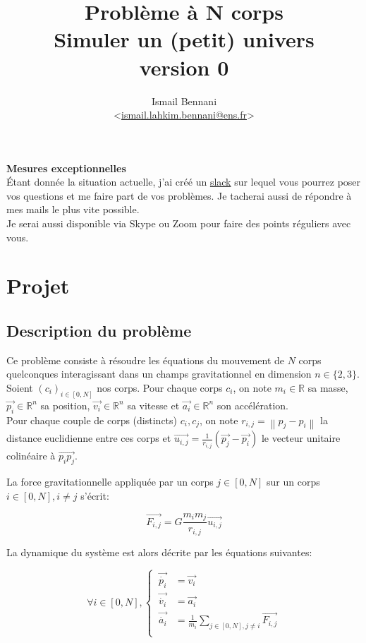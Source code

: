 \documentclass{article}
\title{\textbf{Problème à N corps} \\
       \Large Simuler un (petit) univers\\
       \small version 0}
\author{Ismail Bennani \\
        <\href{mailto:ismail.lahkim.bennani@ens.fr}{ismail.lahkim.bennani@ens.fr}>}
\newcommand{\norm}[1]{\left\lVert#1\right\rVert}
\begin{document}
\maketitle

\noindent\textbf{Mesures exceptionnelles}\\
Étant donnée la situation actuelle, j'ai créé un \href{https://join.slack.com/t/in104n-bodyproblem/shared_invite/zt-cu07sew6-nw8ikZtOZBy2UmpqReQdWA}{slack} sur lequel vous pourrez poser vos questions et me faire part de vos problèmes. Je tacherai aussi de répondre à mes mails le plus vite possible.\\
Je serai aussi disponible via Skype ou Zoom pour faire des points réguliers avec vous.


\section{Projet}

\subsection{Description du problème}

Ce problème consiste à résoudre les équations du mouvement de $N$ corps quelconques interagissant dans un champs gravitationnel en dimension ${n\in \{ 2,3 \}}$.\\
Soient $(c_i)_{i\in[0,N]}$ nos corps. Pour chaque corps $c_i$, on note $m_i \in \mathbb{R}$ sa masse, $\overrightarrow{p_i} \in \mathbb{R}^n$ sa position, $\overrightarrow{v_i} \in \mathbb{R}^n$ sa vitesse et $\overrightarrow{a_i} \in \mathbb{R}^n$ son accélération.\\
Pour chaque couple de corps (distincts) $c_i, c_j$, on note $r_{i,j} = \norm{p_j - p_i}$ la distance euclidienne entre ces corps et $\overrightarrow{u_{i,j}} = \frac{1}{r_{i,j}}(\overrightarrow{p_j}-\overrightarrow{p_i})$ le vecteur unitaire colinéaire à $\overrightarrow{p_ip_j}$.

La force gravitationnelle appliquée par un corps $j \in [0,N]$ sur un corps $i \in [0,N], i \ne j$ s'écrit:

\begin{equation}
    \overrightarrow{F_{i,j}} = G \frac{m_im_j}{r_{i,j}} \overrightarrow{u_{i,j}}
\end{equation}

La dynamique du système est alors décrite par les équations suivantes:

\begin{equation}
\forall i \in [0,N], \left\{\begin{aligned}
    \ \overrightarrow{\dot{p_i}} & = \overrightarrow{v_i} \\
    \ \overrightarrow{\dot{v_i}} & = \overrightarrow{a_i} \\
    \ \overrightarrow{\dot{a_i}} & = \frac{1}{m_i} \sum_{j \in [0,N], j \ne i} \overrightarrow{F_{i,j}} \\
\end{aligned}\right.
\end{equation}
\end{document}
